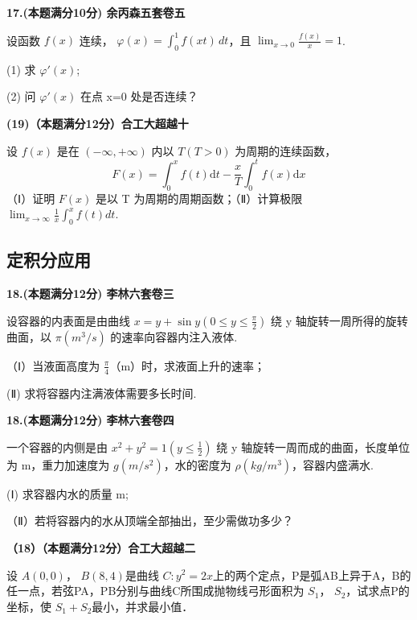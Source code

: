 \documentclass[a4paper,12pt]{article}
\begin{document}
\vspace{0.5cm}

\textbf{17.(本题满分10分) 余丙森五套卷五}

设函数 $ f(x) $ 连续， $ \varphi(x) = \int_{0}^{1} f(xt) \, dt $，且 $ \lim_{x \to 0} \frac{f(x)}{x} = 1 $.

(1) 求 $\varphi'(x)$;

(2) 问 $\varphi'(x)$ 在点 x=0 处是否连续？

\vspace{0.5cm}

\textbf{(19)（本题满分12分）合工大超越十}

设 $f(x)$ 是在 $(-∞,+∞)$ 内以 $T(T>0)$ 为周期的连续函数，
\[ F(x)=\int_{0}^{x}f(t)\mathrm{d}t-\frac{x}{T}\int_{0}^{t}f(x)\mathrm{d}x \]
（Ⅰ）证明 $F(x)$ 是以 T 为周期的周期函数；（Ⅱ）计算极限 $\lim_{x\to\infty}\frac{1}{x}\int_{0}^{x}f(t)dt.$

\subsection{定积分应用}

\textbf{18.(本题满分12分) 李林六套卷三}

设容器的内表面是由曲线 $x = y + \sin y \left(0 \leqslant y \leqslant \frac{\pi}{2}\right)$ 绕 y 轴旋转一周所得的旋转曲面，以 $\pi (m^{3}/s)$ 的速率向容器内注入液体.

（Ⅰ）当液面高度为 $\frac{\pi}{4}$（m）时，求液面上升的速率；

(Ⅱ) 求将容器内注满液体需要多长时间.

\vspace{0.5cm}

\textbf{18.(本题满分12分) 李林六套卷四}

一个容器的内侧是由 $x^{2} + y^{2} = 1 \left( y \leqslant \frac{1}{2} \right)$ 绕 y 轴旋转一周而成的曲面，长度单位为 m，重力加速度为 $g \left( m/s^{2} \right)$，水的密度为 $\rho \left( kg/m^{3} \right)$，容器内盛满水.

(Ⅰ) 求容器内水的质量 m;

（Ⅱ）若将容器内的水从顶端全部抽出，至少需做功多少？

\vspace{0.5cm}

\textbf{（18）（本题满分12分）合工大超越二}

设 $A(0,0)$， $B(8,4)$是曲线 $C:y^{2}=2x$上的两个定点，P是弧AB上异于A，B的任一点，若弦PA，PB分别与曲线C所围成抛物线弓形面积为 $S_{1}$， $S_{2}$，试求点P的坐标，使 $S_{1}+S_{2}$最小，并求最小值．
\end{document}
